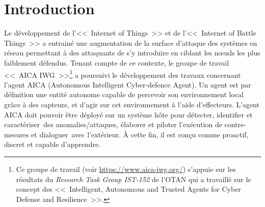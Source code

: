 



\section{Introduction}



Le développement de l'<<~Internet of Things~>> et de l'<<~Internet of Battle Things~>>  a entrainé une augmentation de la surface d'attaque des systèmes en réseau permettant à des attaquants de s'y introduire en ciblant les nœuds les plus faiblement défendus. Tenant compte de ce contexte, le groupe de travail <<~AICA IWG~>>\footnote{Ce groupe de travail (voir \url{https://www.aica-iwg.org/}) s'appuie sur les résultats du \textit{Research Task Group IST-152} de l'OTAN qui a travaillé sur le concept des <<~Intelligent, Autonomous and Trusted Agents for Cyber Defense and Resilience~>>.} a poursuivi le développement des travaux concernant l'agent AICA (Autonomous Intelligent Cyber-defence Agent).
Un agent est par définition une entité autonome capable de percevoir son environnement local grâce à des capteurs, et d’agir sur cet environnement à l'aide d'effecteurs\cite{russell1995modern}.
L'agent AICA doit pouvoir être déployé sur un système hôte pour détecter, identifier et caractériser des anomalies/attaques, élaborer et piloter l’exécution de contre-mesures et dialoguer avec l'extérieur. À cette fin, il est conçu comme proactif, discret et capable d’apprendre.


